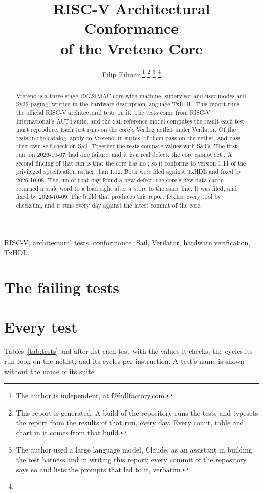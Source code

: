 \documentclass[journal,9pt]{IEEEtran}
\title{RISC-V Architectural Conformance\\of the Vreteno Core}
\author{Filip Filmar%
\thanks{The author is independent, at f@hdlfactory.com.}%
\thanks{This report is generated. A build of the repository
\code{filmil/vreteno-conformance} runs the tests and typesets the
report from the results of that run, every day. Every count, table and
chart in it comes from that build.}%
\thanks{The author used a large language model, Claude, as an assistant
in building the test harness and in writing this report; every commit
of the repository says so and lists the prompts that led to it,
verbatim.}%
\thanks{\buildstamp}}
\begin{document}
\maketitle

\begin{abstract}
Vreteno is a three-stage RV32IMAC core with machine, supervisor and
user modes and Sv32 paging, written in the hardware description
language TxHDL. This report runs the official RISC-V architectural
tests on it. The tests come from RISC-V International's ACT4 suite, and
the Sail reference model computes the result each test must reproduce.
Each test runs on the core's Verilog netlist under Verilator. Of the
\NCatalog{} tests in the catalog, \NTests{} apply to Vreteno, in
\NSuites{} suites. \NRtlPass{} of them pass on the netlist, and
\NSailPass{} pass their own self-check on Sail. Together the tests
compare \NChecks{} values with Sail's. The first run, on 2026-10-07,
had one failure, and it is a real defect: the core cannot set
. A second finding of that run is that the core has
no , so it conforms to version 1.11 of the privileged
specification rather than 1.12. Both were filed against TxHDL and
fixed by 2026-10-08. The run of that day found a new defect: the core's
new data cache returned a stale word to a load right after a store to
the same line. It was filed, and fixed by 2026-10-09. The build that produces this report fetches
every tool by checksum, and it runs every day against the latest
commit of the core.
\end{abstract}

\begin{IEEEkeywords}
RISC-V, architectural tests, conformance, Sail, Verilator, hardware
verification, TxHDL.
\end{IEEEkeywords}

{\footnotesize\tableofcontents}











\appendices
\section{The failing tests}
\label{sec:failures}


\section{Every test}
\label{sec:every}
Tables~\ref{tab:tests} and after list each test with the values it
checks, the cycles its run took on the netlist, and its cycles per
instruction. A test's name is shown without the name of its suite.

\end{document}
